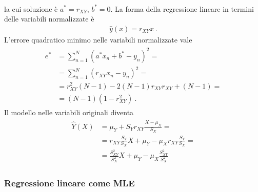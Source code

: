 \documentclass[letterpaper,10pt,italian]{jupyterBook}
\begin{document}
\begin{itemize}
\begin{equation*}
\begin{split}
   \end{split}
\end{equation*}
\sphinxAtStartPar
la cui soluzione è \(a^* = r_{XY}\), \(b^* = 0\). La forma della regressione lineare in termini delle variabili normalizzate è
\begin{equation*}
\begin{split}\hat{y}(x) = r_{XY} x \ .\end{split}
\end{equation*}
\sphinxAtStartPar
L’errore quadratico minimo nelle variabili normalizzate vale
\begin{equation*}
\begin{split}\begin{aligned}
     e^* & = \sum_{n=1}^N ( a^* x_n + b^* - y_n )^2 = \\
         & = \sum_{n=1}^N ( r_{XY} x_n - y_n )^2 = \\
         & = r^2_{XY} (N-1) - 2 (N-1) r_{XY} r_{XY} + (N-1) = \\
         & = (N-1) \left( 1 - r^2_{XY} \right) \ .
   \end{aligned}\end{split}
\end{equation*}
\sphinxAtStartPar
Il modello nelle variabili originali diventa
\begin{equation*}
\begin{split}\begin{aligned}
     \hat{Y}(X) & = \mu_Y + S_Y r_{XY} \frac{X - \mu_X}{S_X} = \\
                & = r_{XY} \frac{S_Y}{S_X} X + \mu_Y - \mu_X r_{XY} \frac{S_Y}{S_X} = \\
                & = \frac{S^2_{XY}}{S^2_X} X + \mu_Y - \mu_X \frac{S^2_{XY}}{S^2_X} 
   \end{aligned}\end{split}
\end{equation*}
\end{itemize}
\subsubsection*{Regressione lineare come MLE}
\end{document}
